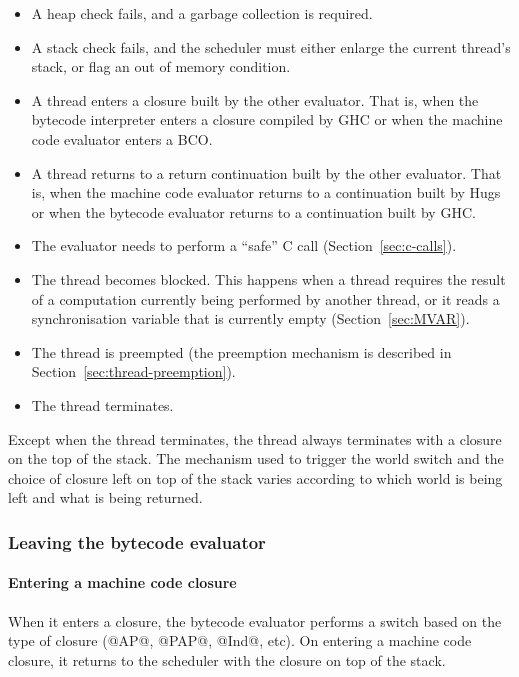 \documentclass[11pt]{article}
\newcommand{\secref}[1]{Section~\ref{sec:#1}}
\newcommand{\Subsubsection}[2]{\subsubsection{#1}\label{sec:#2}}
\begin{document}
\begin{itemize}
\item A heap check fails, and a garbage collection is required.

\item A stack check fails, and the scheduler must either enlarge the
current thread's stack, or flag an out of memory condition.

\item A thread enters a closure built by the other evaluator.  That
is, when the bytecode interpreter enters a closure compiled by GHC or
when the machine code evaluator enters a BCO.

\item A thread returns to a return continuation built by the other
evaluator.  That is, when the machine code evaluator returns to a
continuation built by Hugs or when the bytecode evaluator returns to a
continuation built by GHC.

\item The evaluator needs to perform a ``safe'' C call
(\secref{c-calls}).

\item The thread becomes blocked.  This happens when a thread requires
the result of a computation currently being performed by another
thread, or it reads a synchronisation variable that is currently empty
(\secref{MVAR}).

\item The thread is preempted (the preemption mechanism is described
in \secref{thread-preemption}).

\item The thread terminates.
\end{itemize}

Except when the thread terminates, the thread always terminates with a
closure on the top of the stack.  The mechanism used to trigger the
world switch and the choice of closure left on top of the stack varies
according to which world is being left and what is being returned.

\Subsubsection{Leaving the bytecode evaluator}{hugs-to-ghc-switch}

\paragraph{Entering a machine code closure}

When it enters a closure, the bytecode evaluator performs a switch
based on the type of closure (@AP@, @PAP@, @Ind@, etc).  On entering a
machine code closure, it returns to the scheduler with the closure on
top of the stack.
\end{document}
